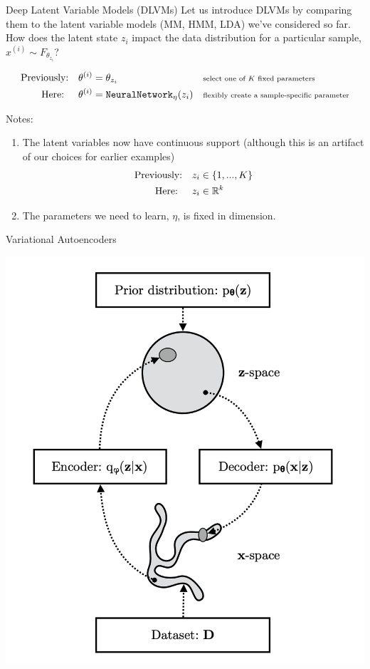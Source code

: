 \documentclass[10pt]{beamer}
\begin{document}
\begin{frame}{Deep Latent Variable Models (DLVMs)}
\footnotesize 
Let us introduce DLVMs by comparing them to the latent variable models  \tiny (MM, HMM, LDA) \footnotesize we've considered so far. \\
\pause 
\vfill 
How does the latent state $z_i$ impact the data distribution for a particular sample, $x^{(i)} \sim F_{\theta_{z_i}}$? 

\begin{align*}
\text{Previously:} \quad & \theta^{(i)} = \theta_{z_i}&& \text{\scriptsize select one of $K$ fixed parameters}  \\ 
\text{Here: } \quad & \theta^{(i)} =  \texttt{NeuralNetwork}_\eta (z_i) && \text{\scriptsize flexibly create a sample-specific parameter} 
\end{align*}

\pause 

Notes:

\begin{enumerate}
\item The latent variables now have continuous support \tiny (although this is an artifact of our choices for earlier examples) \footnotesize 
	\begin{align*}
	\text{Previously:} \quad & z_i \in \{ {1,...,K} \} \\ 
	\text{Here: } \quad & z_i \in \mathbb{R}^k
	\end{align*} \pause 
\item The parameters we need to learn, $\eta$, is  fixed in dimension. 
\end{enumerate}
\end{frame}


\begin{frame}{Variational Autoencoders}
\begin{center}
\includegraphics[width=.6\textwidth]{images/vae}
\end{center}

\vfill \tiny
\end{frame}
\end{document}
